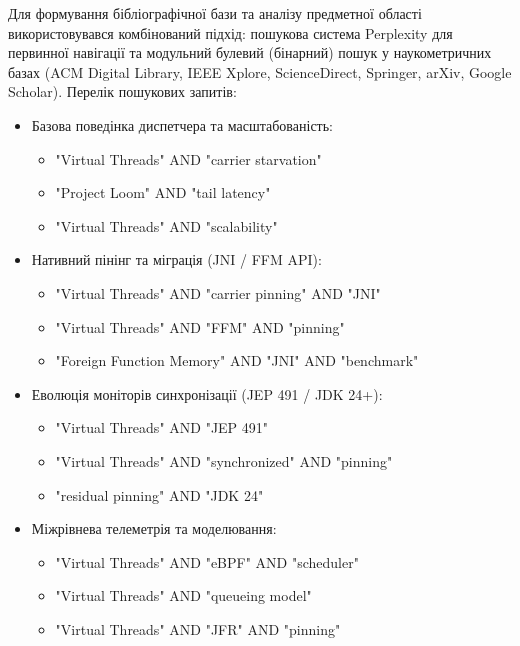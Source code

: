 Для формування бібліографічної бази та аналізу предметної області використовувався комбінований підхід: пошукова система Perplexity для первинної навігації та модульний булевий (бінарний) пошук у наукометричних базах (ACM Digital Library, IEEE Xplore, ScienceDirect, Springer, arXiv, Google Scholar). 
Перелік пошукових запитів:
\begin{itemize}[wide]
    \item Базова поведінка диспетчера та масштабованість:
    \begin{itemize}
        \item \foreignlanguage{english}{"Virtual Threads" AND "carrier starvation"}
        \item \foreignlanguage{english}{"Project Loom" AND "tail latency"}
        \item \foreignlanguage{english}{"Virtual Threads" AND "scalability"}
    \end{itemize}
    \item Нативний пінінг та міграція (JNI / FFM API):
    \begin{itemize}
        \item \foreignlanguage{english}{"Virtual Threads" AND "carrier pinning" AND "JNI"}
        \item \foreignlanguage{english}{"Virtual Threads" AND "FFM" AND "pinning"}
        \item \foreignlanguage{english}{"Foreign Function Memory" AND "JNI" AND "benchmark"}
    \end{itemize}
    \item Еволюція моніторів синхронізації (JEP 491 / JDK 24+):
    \begin{itemize}
        \item \foreignlanguage{english}{"Virtual Threads" AND "JEP 491"}
        \item \foreignlanguage{english}{"Virtual Threads" AND "synchronized" AND "pinning"}
        \item \foreignlanguage{english}{"residual pinning" AND "JDK 24"}
    \end{itemize}
    \item Міжрівнева телеметрія та моделювання:
    \begin{itemize}
        \item \foreignlanguage{english}{"Virtual Threads" AND "eBPF" AND "scheduler"}
        \item \foreignlanguage{english}{"Virtual Threads" AND "queueing model"}
        \item \foreignlanguage{english}{"Virtual Threads" AND "JFR" AND "pinning"}
    \end{itemize}
\end{itemize}

